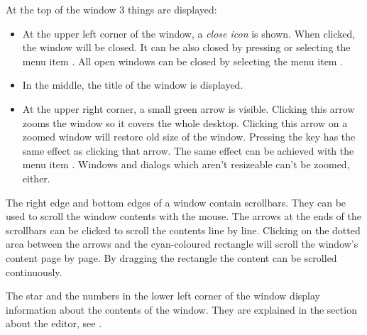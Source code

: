 At the top of the window 3 things are displayed:
\begin{itemize}
\item 
At the upper left corner of the window, a \emph{close icon} is shown. 
When clicked, the window will be closed. It can be also closed by
 pressing  or selecting the menu item . 
All open windows can be closed by selecting the menu item 
.
\item In the middle, the title of the window is displayed.
\item At the upper right corner, a small green arrow is visible.
Clicking this arrow zooms the window so it covers the whole desktop. 
Clicking this arrow on a zoomed window will restore old size of the 
window. Pressing the key  has the same effect as clicking 
that arrow. The same effect can be achieved with the menu item 
. 
Windows and dialogs which aren't resizeable can't be zoomed, either.
\end{itemize}

The right edge and bottom edges of a window contain scrollbars.
They can be used to scroll the window contents with the mouse. 
The arrows at the ends of the scrollbars can be clicked to scroll the 
contents line by line. Clicking on the dotted area between the arrows 
and the cyan-coloured rectangle will scroll the window's content 
page by page. By dragging the rectangle the content can be scrolled 
continuously.

The star and the numbers in the lower left corner of the window
display information about the contents of the window. They
are explained in the section about the editor, see .

%
%
